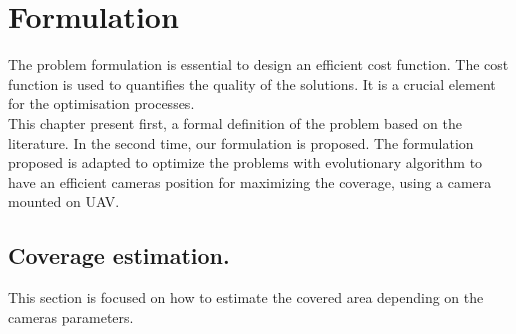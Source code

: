 \chapter{Formulation}\label{chap:formulation}
\minitoc
The problem formulation is essential to design an efficient cost function. The cost function is used to quantifies the quality of the solutions. It is a crucial element for the optimisation processes.\\
This chapter present first, a formal definition of the problem based on the literature. In the second time, our formulation is proposed. The formulation proposed is adapted to optimize the problems with evolutionary algorithm to have an efficient cameras position for maximizing the coverage, using a camera mounted on UAV.

\section{ Coverage estimation. }


This section is focused on how to estimate the covered area depending on the cameras parameters.\\



